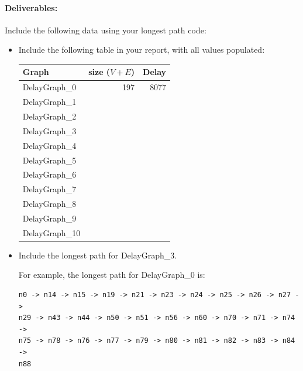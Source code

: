 \paragraph{Deliverables:}
Include the following data using your longest path code:
\begin{itemize}
	\item Include the following table in your report, with all values populated:
	\begin{table}[h!]
	\centering
	\begin{tabular}{|l|r|r|} \hline
	{\bf Graph} & {\bf size ($V+E$)} & Delay \\ \hline
	DelayGraph\_0 & 197 & 8077 \\ \hline
	DelayGraph\_1 &  &  \\ \hline
	DelayGraph\_2 &  &  \\ \hline
	DelayGraph\_3 &  &  \\ \hline
	DelayGraph\_4 &  &  \\ \hline
	DelayGraph\_5 &  &  \\ \hline
	DelayGraph\_6 &  &  \\ \hline
	DelayGraph\_7 &  &  \\ \hline
	DelayGraph\_8 &  &  \\ \hline
	DelayGraph\_9 &  &  \\ \hline
	DelayGraph\_10 &  &  \\ \hline

	\end{tabular}
	\end{table}
	
	\item Include the longest path for DelayGraph\_3.  
	
	For example, the longest path for DelayGraph\_0 is:
	\begin{lstlisting}
n0 -> n14 -> n15 -> n19 -> n21 -> n23 -> n24 -> n25 -> n26 -> n27 -> 
n29 -> n43 -> n44 -> n50 -> n51 -> n56 -> n60 -> n70 -> n71 -> n74 -> 
n75 -> n78 -> n76 -> n77 -> n79 -> n80 -> n81 -> n82 -> n83 -> n84 -> 
n88

	\end{lstlisting}
\end{itemize}

